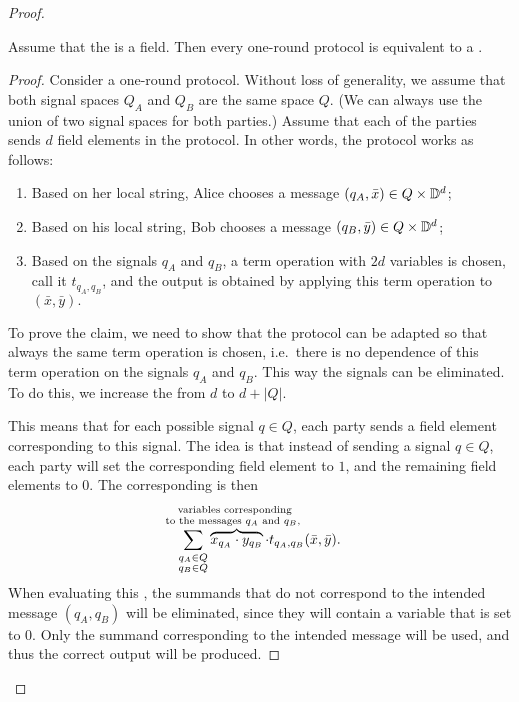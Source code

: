 \begin{proof}
 \begin{claim}
    \label{claim:trivial-messages}
    Assume that the  is a field. 
    Then every one-round protocol is equivalent to a .
 \end{claim}
 \begin{proof} 
    Consider a one-round protocol. Without loss of generality, we assume that
    both signal spaces $Q_A$ and $Q_B$ are the same space $Q$. (We can always
    use the union of two signal spaces for both parties.) Assume that each of
    the parties sends $d$ field elements in the protocol. In other words, the
    protocol works as follows:
    \begin{enumerate}
        \item Based on her local string, Alice chooses a message $(q_A,\bar x) \in Q \times \mathbb D^d$;
        \item Based on his local string, Bob chooses a message $(q_B,\bar y) \in Q \times \mathbb D^d$;
        \item Based on the signals $q_A$ and $q_B$, a term operation  with $2d$ variables is chosen, call it $t_{q_A,q_B}$, and the output is obtained by applying this term operation to $(\bar x, \bar y).$
    \end{enumerate}
    To prove the claim, we need to show that the protocol can be adapted so
    that always the same term operation is chosen, i.e.~there is no dependence
    of this term operation on the signals $q_A$ and $q_B$. This way the signals
    can be eliminated. To do this, we increase the  from $d$ to $d +
    |Q|$. 

    This means that for each possible signal $q \in Q$, each party sends a
    field element corresponding to this signal. The idea is that instead of
    sending a signal $q \in Q$, each party will set the corresponding field
    element to $1$, and the remaining field elements to $0$. The corresponding
     is then 
    \begin{align*}
    \sum_{\substack{q_A \in Q \\ q_B \in Q}} \myoverbrace{x_{q_A} \cdot y_{q_B}}{variables corresponding \\ to the messages $q_A$ and $q_B$, } \cdot t_{q_A,q_B}(\bar x, \bar y).
    \end{align*}
    When evaluating this ,
    the summands that do not correspond to the intended message $(q_A,q_B)$
    will be eliminated, since they will contain a variable that is set to $0$. 
    Only the summand corresponding to the intended message will be used,
    and thus the correct output will be produced. 
 \end{proof}


\end{proof}

